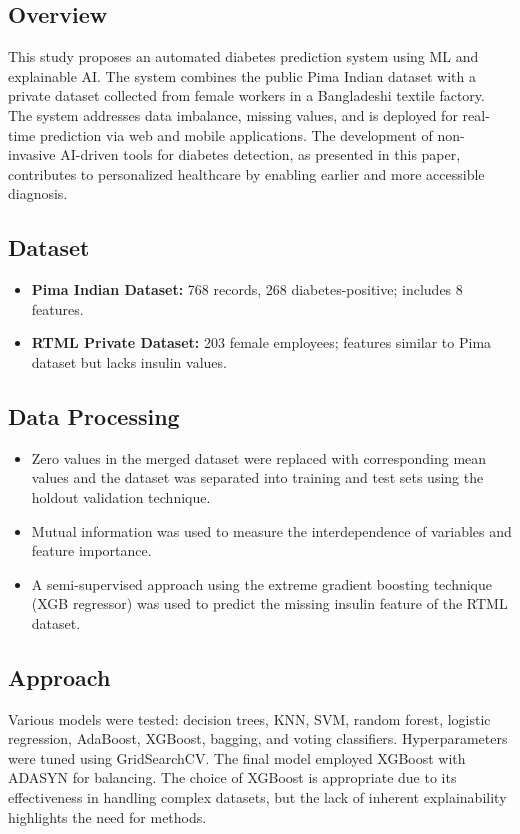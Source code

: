 \subsection*{Overview}
This study proposes an automated diabetes prediction system using ML and explainable AI. The system combines the public Pima Indian dataset with a private dataset collected from female workers in a Bangladeshi textile factory. The system addresses data imbalance, missing values, and is deployed for real-time prediction via web and mobile applications. The development of non-invasive AI-driven tools for diabetes detection, as presented in this paper, contributes to personalized healthcare by enabling earlier and more accessible diagnosis.

\subsection*{Dataset}
\begin{itemize}
    \item \textbf{Pima Indian Dataset:} 768 records, 268 diabetes-positive; includes 8 features.
    \item \textbf{RTML Private Dataset:} 203 female employees; features similar to Pima dataset but lacks insulin values.
\end{itemize}

\subsection*{Data Processing}
\begin{itemize}
    \item Zero values in the merged dataset were replaced with corresponding mean values and the dataset was separated into training and test sets using the holdout validation technique.
    \item Mutual information was used to measure the interdependence of variables and feature importance.
    \item A semi-supervised approach using the extreme gradient boosting technique (XGB regressor) was used to predict the missing insulin feature of the RTML dataset.
\end{itemize}

\subsection*{Approach}
Various models were tested: decision trees, KNN, SVM, random forest, logistic regression, AdaBoost, XGBoost, bagging, and voting classifiers. Hyperparameters were tuned using GridSearchCV. The final model employed XGBoost with ADASYN for balancing. The choice of XGBoost is appropriate due to its effectiveness in handling complex datasets, but the lack of inherent explainability highlights the need for methods.

